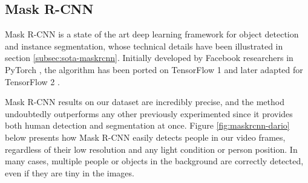 


\subsection{Mask R-CNN}
\label{subsec:masking-maskrcnn}

Mask R-CNN \cite{he2018mask} is a state of the art deep learning framework for object detection and instance segmentation, whose technical details have been illustrated in section \ref{subsec:sota-maskrcnn}. Initially developed by Facebook researchers in PyTorch \cite{pytorch}, the algorithm has been ported on TensorFlow 1 \cite{MaskRCNN_matterport} and later adapted for TensorFlow 2 \cite{MaskRCNN_akTwelve}.

\medskip

Mask R-CNN results on our dataset are incredibly precise, and the method undoubtedly outperforms any other previously experimented since it provides both human detection and segmentation at once. Figure \ref{fig:maskrcnn-dario} below presents how Mask R-CNN easily detects people in our video frames, regardless of their low resolution and any light condition or person position. In many cases, multiple people or objects in the background are correctly detected, even if they are tiny in the images.

